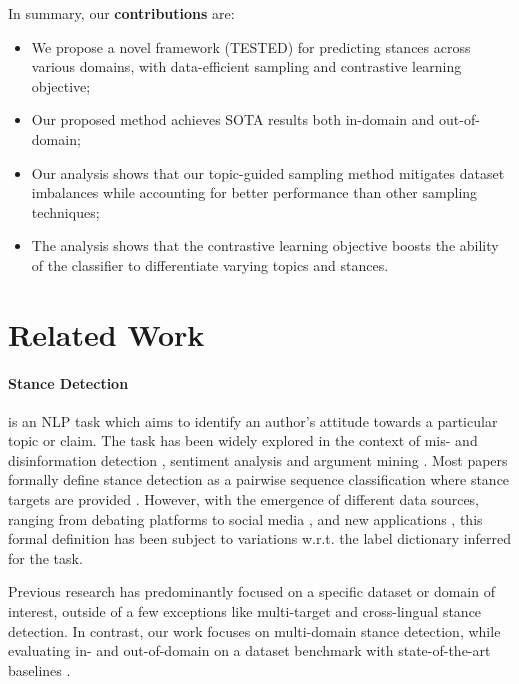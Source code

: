 \documentclass[11pt]{article}
\begin{document}
In summary, our \textbf{contributions} are:
\begin{itemize}[noitemsep]
    \item We propose a novel framework (TESTED) for predicting stances across various domains, with data-efficient sampling and contrastive learning objective;
    \item Our proposed method achieves SOTA results both in-domain and out-of-domain;
    \item Our analysis shows that our topic-guided sampling method mitigates dataset imbalances while accounting for better performance than other sampling techniques; 
    \item The analysis shows that the contrastive learning objective boosts the ability of the classifier to differentiate varying topics and stances.
\end{itemize}

\section{Related Work}
\label{sec:related_work}

\paragraph{Stance Detection} is an NLP task which aims to identify an author's attitude towards a particular topic or claim. The task has been widely explored in the context of mis- and disinformation detection \citep{ferreira2016emergent,hanselowski2018retrospective,ZUBIAGA2018273,hardalov2021survey}, sentiment analysis \citep{mohammad2017stance, aldayel2019your} and argument mining \citep{boltuvzic2014back,sobhani2015argumentation,wang2019survey}. Most papers formally define stance detection as a pairwise sequence classification where stance targets are provided \citep{kuccuk2020stance}. However, with the emergence of different data sources, ranging from debating platforms \citep{somasundaran2010recognizing,hasan2014you,aharoni2014benchmark} to social media \citep{mohammad2016semeval,gorrell2019semeval}, and new applications \citep{zubiaga2018detection,hardalov2021survey}, this formal definition has been subject to variations w.r.t. the label dictionary inferred for the task.

Previous research has predominantly focused on a specific dataset or domain of interest, outside of a few exceptions like multi-target \citep{sobhani2017dataset,wei2018multi} and cross-lingual \citep{hardalov2022few} stance detection. In contrast, our work focuses on multi-domain stance detection, while evaluating in- and out-of-domain on a  dataset benchmark with state-of-the-art baselines \citep{hardalov2021cross}.
\end{document}
